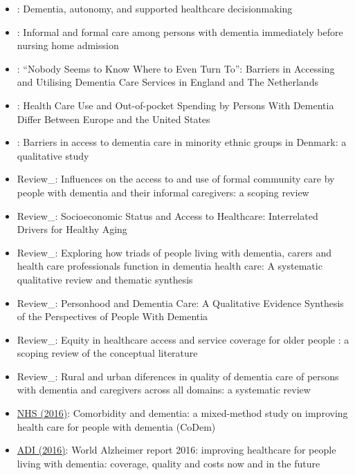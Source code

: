 \documentclass[12pt]{article}
\begin{document}
\begin{itemize}
\begin{itemize}
        \item \cite{wright2019dementia}: Dementia, autonomy, and supported healthcare decisionmaking
        \item \cite{ydstebo2020informal}: Informal and formal care among persons with dementia immediately before nursing home admission
        \item \cite{giebel2021nobody}: “Nobody Seems to Know Where to Even Turn To”: Barriers in Accessing and Utilising Dementia Care Services in England and The Netherlands
        \item \cite{lenzen2021health}: Health Care Use and Out-of-pocket Spending by Persons With Dementia Differ Between Europe and the United States
        \item \cite{nielsen2021barriers}: Barriers in access to dementia care in minority ethnic groups in Denmark: a qualitative study
        \item Review\_\cite{bieber2019influences}: Influences on the access to and use of formal community care by people with dementia and their informal caregivers: a scoping review
        \item Review\_\cite{mcmaughan2020socioeconomic}: Socioeconomic Status and Access to Healthcare: Interrelated Drivers for Healthy Aging
        \item Review\_\cite{tuijt2021exploring}: Exploring how triads of people living with dementia, carers and health care professionals function in dementia health care: A systematic qualitative review and thematic synthesis
        \item Review\_\cite{hennelly2021personhood}: Personhood and Dementia Care: A Qualitative Evidence Synthesis of the Perspectives of People With Dementia
        \item Review\_\cite{carroll2022equity}: Equity in healthcare access and service coverage for older people : a scoping review of the conceptual literature
        \item Review\_\cite{arsenault2023rural}: Rural and urban diferences in quality of dementia care of persons with dementia and caregivers across all domains: a systematic review
        \item \href{https://www.journalslibrary.nihr.ac.uk/hsdr/hsdr04080/#/abstract}{NHS (2016)}: Comorbidity and dementia: a mixed-method study on improving health care for people with dementia (CoDem)
        \item \href{https://www.alzint.org/resource/world-alzheimer-report-2016/}{ADI (2016)}: World Alzheimer report 2016: improving healthcare for people living with dementia: coverage, quality and costs now and in the future 

\end{itemize}
\end{itemize}
\end{document}
